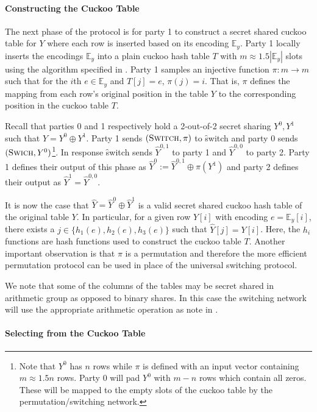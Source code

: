 \paragraph{Constructing the Cuckoo Table}

The next phase of the protocol is for party 1 to construct a secret shared cuckoo table for $Y$ where each row is inserted based on its encoding $\mathbb{E}_y$. Party 1 locally inserts the encodings $\mathbb{E}_y$ into a plain cuckoo hash table $T$ with $m\approx 1.5|\mathbb{E}_y|$ slots using the algorithm specified in . Party 1 samples an injective function $\pi : m\rightarrow m$ such that for the $i$th $e\in \mathbb{E}_y$ and $T[j]=e$, $\pi(j)=i$. That is, $\pi$ defines the mapping from each row's original position in the table $Y$ to the corresponding position in the cuckoo table $T$.

Recall that parties 0 and 1 respectively hold a 2-out-of-2 secret sharing $Y^0,Y^1$ such that $Y=Y^0\oplus Y^1$. 
Party 1 sends $(\textsc{Switch}, \pi)$ to \f{switch} and party 0 sends $(\textsc{Swich}, Y^0)$\footnote{Note that $Y^0$ has $n$ rows while $\pi$ is defined with an input vector containing $m\approx 1.5n$ rows. Party 0 will pad $Y^0$ with $m-n$ rows which contain all zeros. These will be mapped to the empty slots of the cuckoo table by the permutation/switching network.}. In response \f{switch} sends $\hat Y^{0,1}$ to party 1  and $\hat Y^{0,0}$ to party 2. Party 1 defines their output of this phase as $\hat Y^0:=\hat Y^{0,1} \oplus \pi(Y^1)$ and party 2 defines their output as $\hat Y^{1} =\hat Y^{0,0}$.

It is now the case that $\hat Y = \hat Y^0\oplus \hat Y^1$ is a valid secret shared cuckoo hash table of the original table $Y$. In particular, for a given row $Y[i]$ with encoding $e=\mathbb{E}_y[i]$, there exists a $j\in \{h_1(e),h_2(e), h_3(e)\}$ such that  $\hat Y[j] = Y[i]$. Here, the $h_i$ functions are hash functions used to construct the cuckoo table $T$. Another important observation is that $\pi$ is a permutation and therefore the more efficient permutation protocol can be used in place of the universal switching protocol.

We note that some of the columns of the tables may be secret shared in arithmetic group as opposed to binary shares. In this case the switching network will use the appropriate arithmetic operation as note in . 

\paragraph{Selecting from the Cuckoo Table}

